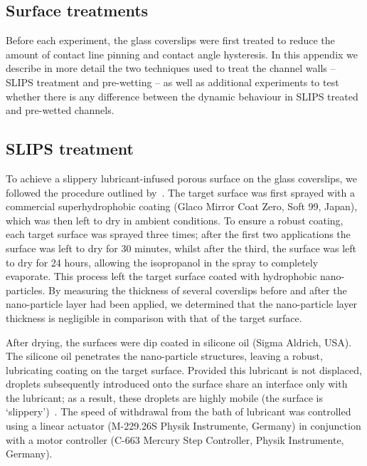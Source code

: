 \begin{subappendices}
\renewcommand{\thesection}{\Alph{section}}
\section{Surface treatments}\label{Appendix:Ch3:SurfaceCoating}
Before each experiment, the glass coverslips were first treated to reduce the amount of contact line pinning and contact angle hysteresis. In this appendix we describe in more detail the two  techniques used to treat the channel walls -- SLIPS treatment and pre-wetting -- as well as additional experiments to test whether there is any difference between the dynamic behaviour in SLIPS treated and pre-wetted  channels.

\subsection{SLIPS treatment}
To achieve a slippery lubricant-infused porous surface on the glass coverslips, we followed the procedure outlined by~\cite{Guan2017SoftMatter}. The target surface was first sprayed with a commercial superhydrophobic coating (Glaco Mirror Coat Zero, Soft 99, Japan), which was then left to dry in ambient conditions. To ensure a robust coating, each target surface was sprayed three times; after the first two applications the surface was left to dry for 30 minutes, whilst after the third, the surface was left to dry for 24 hours, allowing the isopropanol in the spray to completely evaporate. This process left the target surface coated with hydrophobic nano-particles. By measuring the thickness of several coverslips before and after the nano-particle layer had been applied, we determined that the nano-particle layer thickness is negligible in comparison with that of the target surface.

After drying, the surfaces were dip coated in silicone oil (Sigma Aldrich, USA). The silicone oil penetrates the nano-particle structures, leaving a robust, lubricating coating on the target surface. Provided this lubricant is not displaced, droplets subsequently introduced onto the surface share an interface only with the lubricant; as a result, these droplets are highly mobile (the surface is ‘slippery’)~\citep{RuizGutierrez2017PRL}. The speed of withdrawal from the bath of lubricant was controlled using a linear actuator (M-229.26S Physik Instrumente, Germany) in conjunction with a motor controller (C-663 Mercury Step Controller, Physik Instrumente, Germany).


\end{subappendices}
